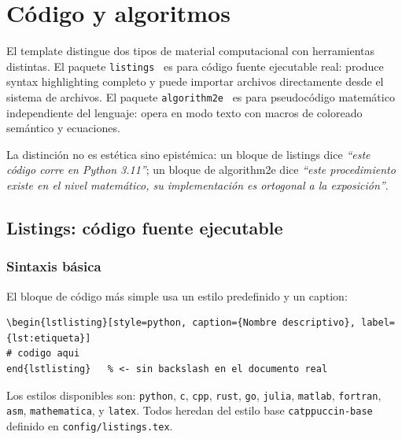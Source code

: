 \chapter{Código y algoritmos}
\label{ch:codigo}

El template distingue dos tipos de material computacional con herramientas
distintas. El paquete \texttt{listings}~\cite{listings2020} es para código
fuente ejecutable real: produce syntax highlighting completo y puede importar
archivos directamente desde el sistema de archivos. El paquete
\texttt{algorithm2e}~\cite{algorithm2e2017} es para pseudocódigo matemático
independiente del lenguaje: opera en modo texto con macros de coloreado
semántico y ecuaciones.

La distinción no es estética sino epistémica: un bloque de listings dice
\textit{``este código corre en Python 3.11''}; un bloque de algorithm2e
dice \textit{``este procedimiento existe en el nivel matemático, su
implementación es ortogonal a la exposición''}.

\section{Listings: código fuente ejecutable}
\label{sec:listings}

\subsection{Sintaxis básica}
\label{subsec:listings-sintaxis}

El bloque de código más simple usa un estilo predefinido y un caption:

\begin{lstlisting}[style=latex, frame=none, numbers=none]
\begin{lstlisting}[style=python, caption={Nombre descriptivo}, label={lst:etiqueta}]
# codigo aqui
end{lstlisting}   % <- sin backslash en el documento real
\end{lstlisting}

Los estilos disponibles son: \texttt{python}, \texttt{c}, \texttt{cpp},
\texttt{rust}, \texttt{go}, \texttt{julia}, \texttt{matlab},
\texttt{fortran}, \texttt{asm}, \texttt{mathematica}, y \texttt{latex}.
Todos heredan del estilo base \texttt{catppuccin-base} definido en
\texttt{config/listings.tex}.


